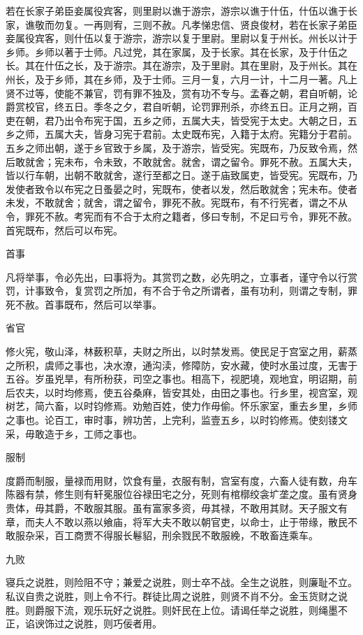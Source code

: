 \documentclass[]{article}
\begin{document}
若在长家子弟臣妾属役宾客，则里尉以谯于游宗，游宗以谯于什伍，什伍以谯于长家，谯敬而勿复。一再则宥，三则不赦。凡孝悌忠信、贤良俊材，若在长家子弟臣妾属役宾客，则什伍以复于游宗，游宗以复于里尉。里尉以复于州长。州长以计于乡师。乡师以著于士师。凡过党，其在家属，及于长家。其在长家，及于什伍之长。其在什伍之长，及于游宗。其在游宗，及于里尉。其在里尉，及于州长。其在州长，及于乡师，其在乡师，及于士师。三月一复，六月一计，十二月一著。凡上贤不过等，使能不兼官，罚有罪不独及，赏有功不专与。孟春之朝，君自听朝，论爵赏校官，终五日。季冬之夕，君自听朝，论罚罪刑杀，亦终五日。正月之朔，百吏在朝，君乃出令布宪于国，五乡之师，五属大夫，皆受宪于太史。大朝之日，五乡之师，五属大夫，皆身习宪于君前。太史既布宪，入籍于太府。宪籍分于君前。五乡之师出朝，遂于乡官致于乡属，及于游宗，皆受宪。宪既布，乃反致令焉，然后敢就舍；宪未布，令未致，不敢就舍。就舍，谓之留令。罪死不赦。五属大夫，皆以行车朝，出朝不敢就舍，遂行至都之日。遂于庙致属吏，皆受宪。宪既布，乃发使者致令以布宪之日蚤晏之时，宪既布，使者以发，然后敢就舍；宪未布。使者未发，不敢就舍；就舍，谓之留令，罪死不赦。宪既布，有不行宪者，谓之不从令，罪死不赦。考宪而有不合于太府之籍者，侈曰专制，不足曰亏令，罪死不赦。首宪既布，然后可以布宪。

首事

凡将举事，令必先出，曰事将为。其赏罚之数，必先明之，立事者，谨守令以行赏罚，计事致令，复赏罚之所加，有不合于令之所谓者，虽有功利，则谓之专制，罪死不赦。首事既布，然后可以举事。

省官

修火宪，敬山泽，林薮积草，夫财之所出，以时禁发焉。使民足于宫室之用，薪蒸之所积，虞师之事也，决水潦，通沟渎，修障防，安水藏，使时水虽过度，无害于五谷。岁虽兇旱，有所秎获，司空之事也。相高下，视肥墝，观地宜，明诏期，前后农夫，以时均修焉，使五谷桑麻，皆安其处，由田之事也。行乡里，视宫室，观树艺，简六畜，以时钧修焉。劝勉百姓，使力作毋偷。怀乐家室，重去乡里，乡师之事也。论百工，审时事，辨功苦，上完利，监壹五乡，以时钧修焉。使刻镂文采，毋敢造于乡，工师之事也。

服制

度爵而制服，量禄而用财，饮食有量，衣服有制，宫室有度，六畜人徒有数，舟车陈器有禁，修生则有轩冕服位谷禄田宅之分，死则有棺槨绞衾圹垄之度。虽有贤身贵体，毋其爵，不敢服其服。虽有富家多资，毋其禄，不敢用其财。天子服文有章，而夫人不敢以燕以飨庙，将军大夫不敢以朝官吏，以命士，止于带缘，散民不敢服杂采，百工商贾不得服长鬈貂，刑余戮民不敢服絻，不敢畜连乘车。

九败

寝兵之说胜，则险阻不守；兼爱之说胜，则士卒不战。全生之说胜，则廉耻不立。私议自贵之说胜，则上令不行。群徒比周之说胜，则贤不肖不分。金玉货财之说胜。则爵服下流，观乐玩好之说胜。则奸民在上位。请谒任举之说胜，则绳墨不正，谄谀饰过之说胜，则巧佞者用。
\end{document}
